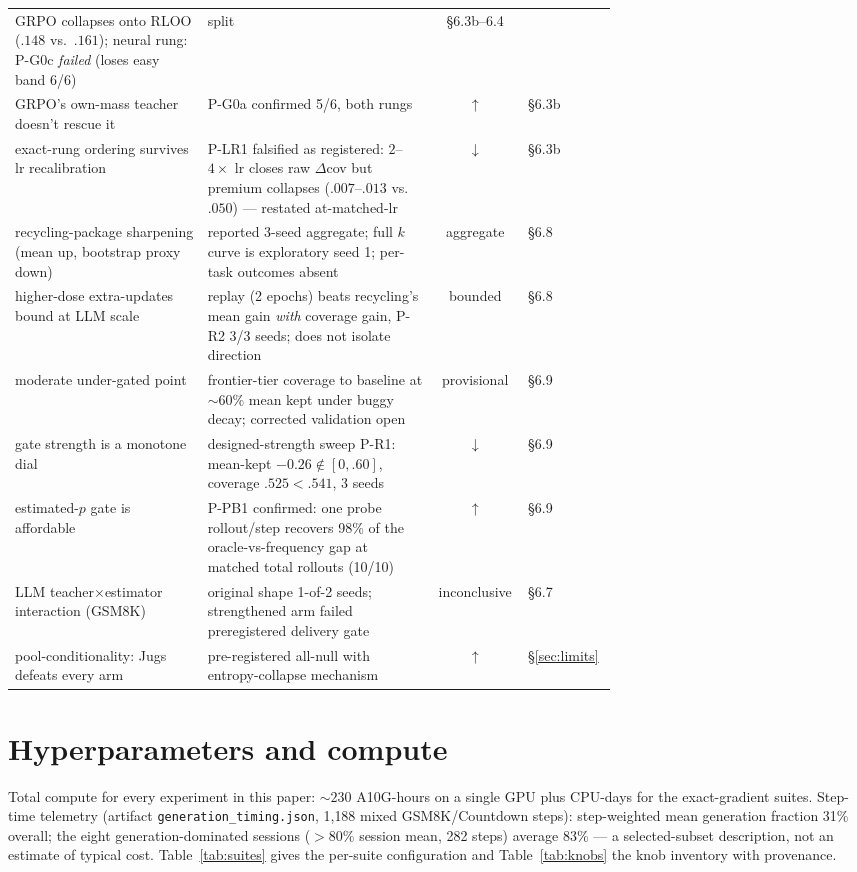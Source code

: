 \begin{table}[h]
\begin{tabular}{@{}p{0.32\linewidth}p{0.38\linewidth}cl@{}}
GRPO collapses onto RLOO ($.148$ vs.\ $.161$); neural rung: P-G0c
\emph{failed} (loses easy band 6/6) & split & \S 6.3b--6.4 \\
GRPO's own-mass teacher doesn't rescue it & P-G0a confirmed 5/6,
both rungs & $\uparrow$ & \S 6.3b \\
exact-rung ordering survives lr recalibration & P-LR1 falsified as
registered: $2$--$4\times$ lr closes raw $\Delta$cov but premium
collapses ($.007$--$.013$ vs.\ $.050$) --- restated at-matched-lr &
$\downarrow$ & \S 6.3b \\
recycling-package sharpening (mean up, bootstrap proxy down) & reported
3-seed aggregate; full $k$ curve is exploratory seed 1; per-task outcomes
absent & aggregate & \S 6.8 \\
higher-dose extra-updates bound at LLM scale & replay (2 epochs) beats
recycling's mean gain \emph{with} coverage gain, P-R2 3/3 seeds; does
not isolate direction & bounded & \S 6.8 \\
moderate under-gated point & frontier-tier coverage to baseline at
${\sim}60\%$ mean kept under buggy decay; corrected validation open &
provisional & \S 6.9 \\
gate strength is a monotone dial & designed-strength sweep P-R1:
mean-kept $-0.26 \notin [0,.60]$, coverage $.525 < .541$, 3 seeds &
$\downarrow$ & \S 6.9 \\
estimated-$p$ gate is affordable & P-PB1 confirmed: one probe
rollout/step recovers 98\% of the oracle-vs-frequency gap at matched
total rollouts (10/10) & $\uparrow$ & \S 6.9 \\
LLM teacher$\times$estimator interaction (GSM8K) & original shape
1-of-2 seeds; strengthened arm failed preregistered delivery gate &
inconclusive & \S 6.7 \\
pool-conditionality: Jugs defeats every arm & pre-registered
all-null with entropy-collapse mechanism & $\uparrow$ &
\S\ref{sec:limits} \\
\bottomrule
\end{tabular}
\end{table}

\section{Hyperparameters and compute}\label{app:hparams}

Total compute for every experiment in this paper: ${\sim}230$
A10G-hours on a single GPU plus CPU-days for the exact-gradient suites.
Step-time telemetry (artifact \texttt{generation\_timing.json}, 1{,}188
mixed GSM8K/Countdown steps): step-weighted mean generation fraction
31\% overall; the eight generation-dominated sessions ($>$80\% session
mean, 282 steps) average 83\% --- a selected-subset description, not
an estimate of typical cost. Table~\ref{tab:suites} gives the
per-suite configuration and Table~\ref{tab:knobs} the knob inventory
with provenance.

